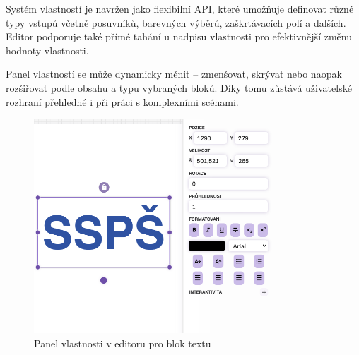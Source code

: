 Systém vlastností je navržen jako flexibilní API, které umožňuje definovat různé typy vstupů včetně posuvníků, barevných výběrů, zaškrtávacích polí a dalších. 
Editor podporuje také přímé tahání u nadpisu vlastnosti pro efektivnější změnu hodnoty vlastnosti.

Panel vlastností se může dynamicky měnit -- zmenšovat, skrývat nebo naopak rozšiřovat podle obsahu a typu vybraných bloků. 
Díky tomu zůstává uživatelské rozhraní přehledné i při práci s komplexními scénami.


\begin{figure}[ht!]
    \centering
    \includegraphics[width=0.8\textwidth]{media/05_realizace/vlastnosti.png}
    \caption{Panel vlastnosti v editoru pro blok textu}
    \label{fig:realizace/vlastnosti}
\end{figure}






